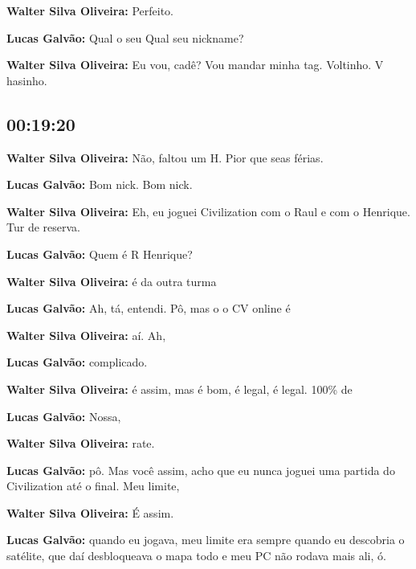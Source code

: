 \textbf{Walter Silva Oliveira:} Perfeito.



\textbf{Lucas Galvão:} Qual o seu Qual seu nickname?



\textbf{Walter Silva Oliveira:} Eu vou, cadê? Vou mandar minha tag. Voltinho. V hasinho.



\subsection{\textbf{00:19:20}}



\textbf{Walter Silva Oliveira:} Não, faltou um H. Pior que seas férias.



\textbf{Lucas Galvão:} Bom nick. Bom nick.



\textbf{Walter Silva Oliveira:} Eh, eu joguei Civilization com o Raul e com o Henrique. Tur de reserva.



\textbf{Lucas Galvão:} Quem é R Henrique?



\textbf{Walter Silva Oliveira:} é da outra turma



\textbf{Lucas Galvão:} Ah, tá, entendi. Pô, mas o o CV online é



\textbf{Walter Silva Oliveira:} aí. Ah,



\textbf{Lucas Galvão:} complicado.



\textbf{Walter Silva Oliveira:} é assim, mas é bom, é legal, é legal. 100\% de



\textbf{Lucas Galvão:} Nossa,



\textbf{Walter Silva Oliveira:} rate.



\textbf{Lucas Galvão:} pô. Mas você assim, acho que eu nunca joguei uma partida do Civilization até o final. Meu limite,



\textbf{Walter Silva Oliveira:} É assim.



\textbf{Lucas Galvão:} quando eu jogava, meu limite era sempre quando eu descobria o satélite, que daí desbloqueava o mapa todo e meu PC não rodava mais ali, ó.



